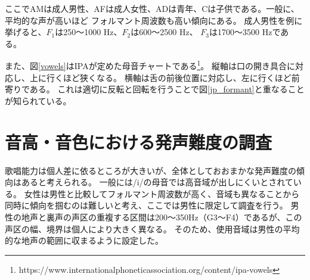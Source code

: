 \documentclass[10.5ptj,a4j,dvipdfmx,uplatex, oneside, openany, report]{jsbook}%
\begin{document}
ここでAMは成人男性、AFは成人女性、ADは青年、Cは子供である。一般に、平均的な声が高いほど
フォルマント周波数も高い傾向にある。
成人男性を例に挙げると、$F_1$は250〜1000 \si{Hz}、$F_2$は600〜2500 \si{Hz}、
$F_3$は1700〜3500 \si{Hz}である\cite{science}。


また、図\ref{vowels}はIPAが定めた母音チャートである\footnote{https://www.internationalphoneticassociation.org/content/ipa-vowels}。
縦軸は口の開き具合に対応し、上に行くほど狭くなる。
横軸は舌の前後位置に対応し、左に行くほど前寄りである。
これは適切に反転と回転を行うことで図\ref{jp_formant}と重なることが知られている。







\chapter{音高・音色における発声難度の調査}

歌唱能力は個人差に依るところが大きいが、全体としておおまかな発声難度の傾向はあると考えられる。
一般には/i/の母音では高音域が出しにくいとされている。
女性は男性と比較してフォルマント周波数が高く、音域も異なることから同時に傾向を掴むのは難しいと考え、ここでは男性に限定して調査を行う。
男性の地声と裏声の声区の重複する区間は200〜350Hz（G3〜F4）であるが、この声区の幅、境界は個人により大きく異なる。
そのため、使用音域は男性の平均的な地声の範囲に収まるように設定した。
\end{document}
